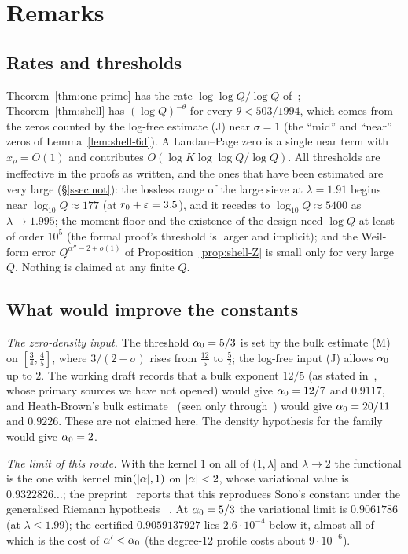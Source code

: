\section{Remarks}\label{sec:remarks}

\subsection{Rates and thresholds}
Theorem~\ref{thm:one-prime} has the rate $\log\log Q/\log Q$ of~\cite{DSouza}; Theorem~\ref{thm:shell} has $(\log Q)^{-\theta}$ for every $\theta<503/1994$, which comes from the
zeros counted by the log-free estimate (J) near $\sigma=1$ (the ``mid'' and ``near'' zeros of Lemma~\ref{lem:shell-6d}). A Landau--Page zero is a single near term with
$x_\rho=O(1)$ and contributes $O(\log K\log\log Q/\log Q)$. All thresholds are ineffective in the proofs as written, and the ones that have been estimated are very
large (\S\ref{ssec:not}): the lossless range of the large sieve at $\lambda=1.91$ begins near $\log_{10}Q\approx177$ (at $r_0+\varepsilon=3.5$), and it recedes to
$\log_{10}Q\approx5400$ as $\lambda\to1.995$; the moment floor and the existence of the design need $\log Q$ at least of order $10^5$ (the formal proof's
threshold is larger and implicit); and the Weil-form error
$Q^{\alpha''-2+o(1)}$ of Proposition~\ref{prop:shell-Z} is small only for very large $Q$. Nothing is claimed at any finite $Q$.

\subsection{What would improve the constants}
\emph{The zero-density input.} The threshold $\alpha_0=5/3$ is set by the bulk estimate (M) on $[\frac34,\frac45]$, where $3/(2-\sigma)$ rises from $\frac{12}5$ to $\frac52$;
the log-free input (J) allows $\alpha_0$ up to $2$. The working draft records that a bulk exponent $12/5$ (as stated in~\cite[Theorem~4.1]{DFS25}, whose primary sources we
have not opened) would give $\alpha_0=12/7$ and $0.9117$, and Heath-Brown's bulk estimate~\cite{HBCanad79} (seen only through~\cite{Pintz18}) would give $\alpha_0=20/11$ and
$0.9226$. These are not claimed here. The density hypothesis for the family would give $\alpha_0=2$.

\emph{The limit of this route.} With the kernel $1$ on all of $(1,\lambda]$ and $\lambda\to2$ the functional is the one with kernel $\min(\lvert \alpha\rvert,1)$ on $\lvert \alpha\rvert<2$,
whose variational value is $0.9322826\ldots$; the preprint~\cite{DSouza} reports that this reproduces Sono's constant under the generalised Riemann
hypothesis~\cite{Sono16} \Vsim. At $\alpha_0=5/3$ the variational limit is $0.9061786$ (at $\lambda\le1.99$); the certified $0.9059137927$ lies $2.6\cdot10^{-4}$ below
it, almost all of which is the cost of $\alpha'<\alpha_0$ (the degree-$12$ profile costs about $9\cdot10^{-6}$).

